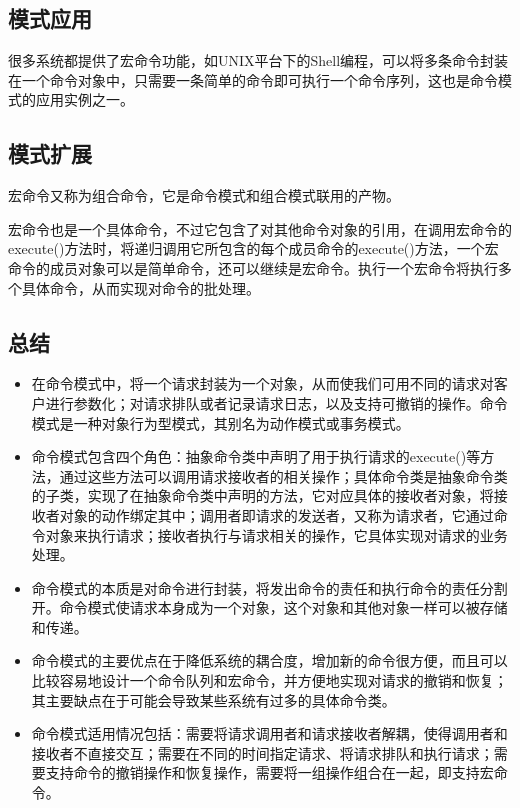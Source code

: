 \documentclass[letterpaper,10pt,english]{sphinxmanual}
\begin{document}
\subsection{模式应用}
\label{\detokenize{behavioral_patterns/command:id13}}
\sphinxAtStartPar
很多系统都提供了宏命令功能，如UNIX平台下的Shell编程，可以将多条命令封装在一个命令对象中，只需要一条简单的命令即可执行一个命令序列，这也是命令模式的应用实例之一。


\subsection{模式扩展}
\label{\detokenize{behavioral_patterns/command:id14}}
\sphinxAtStartPar
宏命令又称为组合命令，它是命令模式和组合模式联用的产物。

\sphinxAtStartPar
\sphinxhyphen{}宏命令也是一个具体命令，不过它包含了对其他命令对象的引用，在调用宏命令的execute()方法时，将递归调用它所包含的每个成员命令的execute()方法，一个宏命令的成员对象可以是简单命令，还可以继续是宏命令。执行一个宏命令将执行多个具体命令，从而实现对命令的批处理。


\subsection{总结}
\label{\detokenize{behavioral_patterns/command:id15}}\begin{itemize}
\item {} 
\sphinxAtStartPar
在命令模式中，将一个请求封装为一个对象，从而使我们可用不同的请求对客户进行参数化；对请求排队或者记录请求日志，以及支持可撤销的操作。命令模式是一种对象行为型模式，其别名为动作模式或事务模式。

\item {} 
\sphinxAtStartPar
命令模式包含四个角色：抽象命令类中声明了用于执行请求的execute()等方法，通过这些方法可以调用请求接收者的相关操作；具体命令类是抽象命令类的子类，实现了在抽象命令类中声明的方法，它对应具体的接收者对象，将接收者对象的动作绑定其中；调用者即请求的发送者，又称为请求者，它通过命令对象来执行请求；接收者执行与请求相关的操作，它具体实现对请求的业务处理。

\item {} 
\sphinxAtStartPar
命令模式的本质是对命令进行封装，将发出命令的责任和执行命令的责任分割开。命令模式使请求本身成为一个对象，这个对象和其他对象一样可以被存储和传递。

\item {} 
\sphinxAtStartPar
命令模式的主要优点在于降低系统的耦合度，增加新的命令很方便，而且可以比较容易地设计一个命令队列和宏命令，并方便地实现对请求的撤销和恢复；其主要缺点在于可能会导致某些系统有过多的具体命令类。

\item {} 
\sphinxAtStartPar
命令模式适用情况包括：需要将请求调用者和请求接收者解耦，使得调用者和接收者不直接交互；需要在不同的时间指定请求、将请求排队和执行请求；需要支持命令的撤销操作和恢复操作，需要将一组操作组合在一起，即支持宏命令。

\end{itemize}
\end{document}
